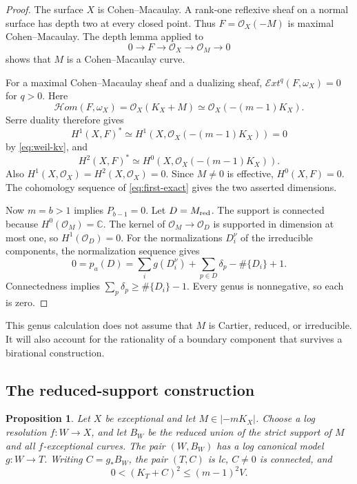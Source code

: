 \documentclass[12pt,a4paper]{article}
\numberwithin{equation}{section}
\newtheorem{proposition}[theorem]{Proposition}
\theoremstyle{definition}
\newcommand{\C}{\mathbb C}
\newcommand{\OO}{\mathcal O}
\begin{document}
\begin{proof}
The surface \(X\) is Cohen--Macaulay. A rank-one reflexive sheaf on
a normal surface has depth two at every closed point.
Thus \(F=\OO_X(-M)\) is maximal Cohen--Macaulay.
The depth lemma applied to
\begin{equation}\label{eq:first-exact}
                  0\longrightarrow F\longrightarrow\OO_X
                       \longrightarrow\OO_M\longrightarrow0
\end{equation}
shows that \(M\) is a Cohen--Macaulay curve.

For a maximal Cohen--Macaulay sheaf and a dualizing sheaf,
\(\mathcal Ext^q(F,\omega_X)=0\) for \(q>0\).
Here
\[
 \mathcal Hom(F,\omega_X)
       =\OO_X(K_X+M)
       \simeq\OO_X(-(m-1)K_X).
\]
Serre duality therefore gives
\[
 H^1(X,F)^*\simeq H^1(X,\OO_X(-(m-1)K_X))=0
\]
by \eqref{eq:weil-kv}, and
\[
 H^2(X,F)^*\simeq H^0(X,\OO_X(-(m-1)K_X)).
\]
Also \(H^1(X,\OO_X)=H^2(X,\OO_X)=0\).
Since \(M\ne0\) is effective, \(H^0(X,F)=0\).
The cohomology sequence of \eqref{eq:first-exact} gives
the two asserted dimensions.

Now \(m=b>1\) implies \(P_{b-1}=0\).
Let \(D=M_{\rm red}\).
The support is connected because \(H^0(\OO_M)=\C\).
The kernel of \(\OO_M\to\OO_D\) is supported in dimension at most
one, so \(H^1(\OO_D)=0\).
For the normalizations \(D_i^\nu\) of the irreducible components,
the normalization sequence gives
\[
 0=p_a(D)=\sum_i g(D_i^\nu)+\sum_{p\in D}\delta_p-\#\{D_i\}+1.
\]
Connectedness implies \(\sum_p\delta_p\geq\#\{D_i\}-1\).
Every genus is nonnegative, so each is zero.
\end{proof}

This genus calculation does not assume that \(M\) is Cartier,
reduced, or irreducible. It will also account for the rationality
of a boundary component that survives a birational construction.

\subsection{The reduced-support construction}

\begin{proposition}\label{prop:support}
Let \(X\) be exceptional and let \(M\in|-mK_X|\).
Choose a log resolution \(f:W\to X\), and let \(B_W\) be the
reduced union of the strict support of \(M\) and all \(f\)-exceptional
curves. The pair \((W,B_W)\) has a log canonical model
\(g:W\to T\).
Writing \(C=g_*B_W\), the pair \((T,C)\) is lc,
\(C\ne0\) is connected, and
\begin{equation}\label{eq:support-volume}
                         0<(K_T+C)^2\leq(m-1)^2V.
\end{equation}
\end{proposition}
\end{document}
